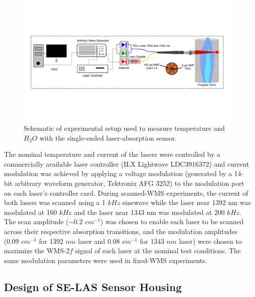  \begin{figure}[ht]
    \centering
        \includegraphics[trim = 0mm 52mm 0mm 52mm, clip=true, width=1\textwidth]{fig/ch4_fig1.pdf}
        \caption{Schematic of experimental setup used to measure temperature and $H_2O$ with the single-ended laser-absorption sensor.}
    \label{fig:ch4_3}
\end{figure}

The nominal temperature and current of the lasers were controlled by a commercially available laser controller (ILX Lightwave LDC3916372) and current modulation was achieved by applying a voltage modulation (generated by a 14-bit arbitrary waveform generator, Tektronix AFG 3252) to the modulation port on each laser's controller card. During scanned-WMS experiments, the current of both lasers was scanned using a 1 $kHz$ sinewave while the laser near 1392 nm was modulated at 160 $kHz$ and the laser near 1343 nm was modulated at 200 $kHz$. The scan amplitude ($\sim 0.2$ $cm^{-1}$) was chosen to enable each laser to be scanned across their respective absorption transitions, and the modulation amplitudes (0.09 $cm^{-1}$ for 1392 $nm$ laser and 0.08 $cm^{-1}$ for 1343 $nm$ laser) were chosen to maximize the WMS-$2f$ signal of each laser at the nominal test conditions. The same modulation parameters were used in fixed-WMS experiments.


\subsection{Design of SE-LAS Sensor Housing}

